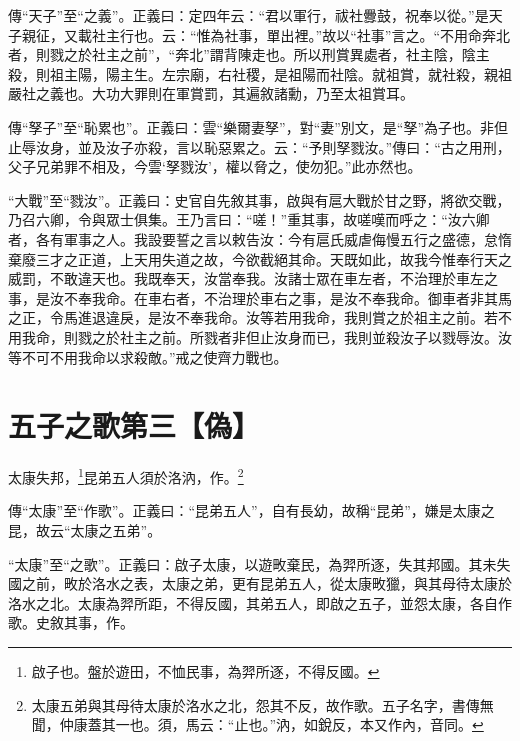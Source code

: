 {\noindent\zhuan{}\fzbyks 傳“天子”至“之義”。正義曰：定四年云：“君以軍行，祓社釁鼓，祝奉以從。”是天子親征，又載社主行也。云：“惟為社事，單出裡。”故以“社事”言之。“不用命奔北者，則戮之於社主之前”，“奔北”謂背陳走也。所以刑賞異處者，社主陰，陰主殺，則祖主陽，陽主生。左宗廟，右社稷，是祖陽而社陰。就祖賞，就社殺，親祖嚴社之義也。大功大罪則在軍賞罰，其遍敘諸勳，乃至太祖賞耳。 \par}

{\noindent\zhuan{}\fzbyks 傳“孥子”至“恥累也”。正義曰：雲“樂爾妻孥”，對“妻”別文，是“孥”為子也。非但止辱汝身，並及汝子亦殺，言以恥惡累之。云：“予則孥戮汝。”傳曰：“古之用刑，父子兄弟罪不相及，今雲‘孥戮汝’，權以脅之，使勿犯。”此亦然也。 \par}

{\noindent\shu{}\fzkt “大戰”至“戮汝”。正義曰：史官自先敘其事，啟與有扈大戰於甘之野，將欲交戰，乃召六卿，令與眾士俱集。王乃言曰：“嗟！”重其事，故嗟嘆而呼之：“汝六卿者，各有軍事之人。我設要誓之言以敕告汝：今有扈氏威虐侮慢五行之盛德，怠惰棄廢三才之正道，上天用失道之故，今欲截絕其命。天既如此，故我今惟奉行天之威罰，不敢違天也。我既奉天，汝當奉我。汝諸士眾在車左者，不治理於車左之事，是汝不奉我命。在車右者，不治理於車右之事，是汝不奉我命。御車者非其馬之正，令馬進退違戾，是汝不奉我命。汝等若用我命，我則賞之於祖主之前。若不用我命，則戮之於社主之前。所戮者非但止汝身而已，我則並殺汝子以戮辱汝。汝等不可不用我命以求殺敵。”戒之使齊力戰也。 \par}

\section{五子之歌第三【偽】}


太康失邦，\footnote{啟子也。盤於遊田，不恤民事，為羿所逐，不得反國。}昆弟五人須於洛汭，作。\footnote{太康五弟與其母待太康於洛水之北，怨其不反，故作歌。五子名字，書傳無聞，仲康蓋其一也。須，馬云：“止也。”汭，如銳反，本又作內，音同。}


{\noindent\zhuan{}\fzbyks 傳“太康”至“作歌”。正義曰：“昆弟五人”，自有長幼，故稱“昆弟”，嫌是太康之昆，故云“太康之五弟”。 \par}

{\noindent\shu{}\fzkt “太康”至“之歌”。正義曰：啟子太康，以遊畋棄民，為羿所逐，失其邦國。其未失國之前，畋於洛水之表，太康之弟，更有昆弟五人，從太康畋獵，與其母待太康於洛水之北。太康為羿所距，不得反國，其弟五人，即啟之五子，並怨太康，各自作歌。史敘其事，作。 \par}

